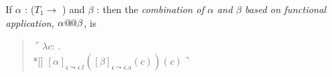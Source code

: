 \begin{ex}
\begin{subex}
\item If $\alpha$ : ($T_1\rightarrow$ ) 
                         and $\beta$ : 
                         then the \textit{combination of $\alpha$ and
    $\beta$  based on functional application}, $\alpha\text{@\!@}\beta$, is
  \begin{quote}
    $\ulcorner\lambda c$:
      . \\*[\baselineskip]
      \hspace*{10em}$[\alpha]_{\mathfrak{c}\leadsto\mathfrak{c}.\text{f}}([\beta]_{\mathfrak{c}\leadsto\mathfrak{c}.\text{a}}(c))(c)\urcorner$
    \end{quote}
    
 
\end{subex} 
   
\end{ex}

  
  





